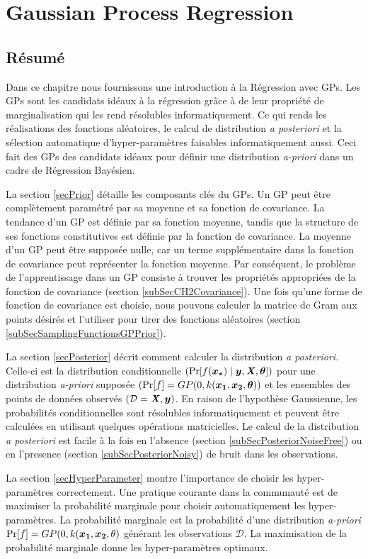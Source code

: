 \chapter{Gaussian Process Regression}
\label{chapGp}

\begin{mdframed}[hidealllines=true,backgroundcolor=lightgray!20]
\section*{Résumé}
Dans ce chapitre nous fournissons une introduction à la Régression avec GPs. Les GPs sont les candidats idéaux à la régression grâce à de leur propriété de marginalisation qui les rend résolubles  informatiquement. Ce qui rends les réalisations des fonctions aléatoires, le calcul de distribution \textit{a posteriori} et la sélection automatique d'hyper-paramètres faisables informatiquement aussi. Ceci fait des GPs des candidats idéaux pour définir une distribution \textit{a-priori} dans un cadre de Régression Bayésien. 

La section \ref{secPrior} détaille les composants clés du GPs. Un GP peut être complètement paramétré par sa moyenne et sa fonction de covariance. La tendance d'un GP est définie par sa fonction moyenne, tandis que la structure de ses fonctions constitutives est définie par la fonction de covariance. La moyenne d'un GP peut être supposée nulle, car un terme supplémentaire dans la fonction de covariance peut représenter la fonction moyenne. Par conséquent, le problème de l'apprentissage dans un GP consiste à trouver les propriétés appropriées de la fonction de covariance (section  \ref{subSecCH2Covariance}). Une fois qu'une forme de fonction de covariance est choisie, nous pouvons calculer la matrice de Gram aux points désirés et l'utiliser pour tirer des fonctions aléatoires (section \ref{subSecSamplingFunctionsGPPrior}).

La section \ref{secPosterior} décrit comment calculer la distribution \textit{a posteriori}. Celle-ci est la distribution conditionnelle $(\Pr[f(\boldsymbol{x_{*}}) \mid \boldsymbol{y}, \bm{\mathit{X}}, \boldsymbol{\theta}])$  pour une distribution \textit{a-priori} supposée $(\Pr[f] = GP(0, k(\boldsymbol{x_1}, \boldsymbol{x_2}, \boldsymbol{\theta}))$  et les ensembles des points de données observés $(\mathcal{D} = {\bm{\mathit{X}}, \boldsymbol{y}})$. En raison de l'hypothèse  Gaussienne, les probabilités conditionnelles sont résolubles informatiquement et peuvent être calculées en utilisant quelques opérations matricielles. Le calcul de la distribution \textit{a posteriori} est facile à la fois en l'absence (section \ref{subSecPosteriorNoiseFree}) ou en l'presence (section \ref{subSecPosteriorNoisy}) de bruit dans les observations.

La section \ref{secHyperParameter} montre l'importance de choisir les hyper-paramètres correctement. Une pratique courante dans la communauté est de maximiser la probabilité marginale pour choisir automatiquement les hyper-paramètres. La probabilité marginale est la probabilité d'une distribution \textit{a-priori} $\Pr[f] = GP(0, k(\boldsymbol{x_1}, \boldsymbol{x_2}, \theta)$  générant les observations $ \mathcal{D} $. La maximisation de la probabilité marginale donne les hyper-paramètres optimaux.
\end{mdframed}


